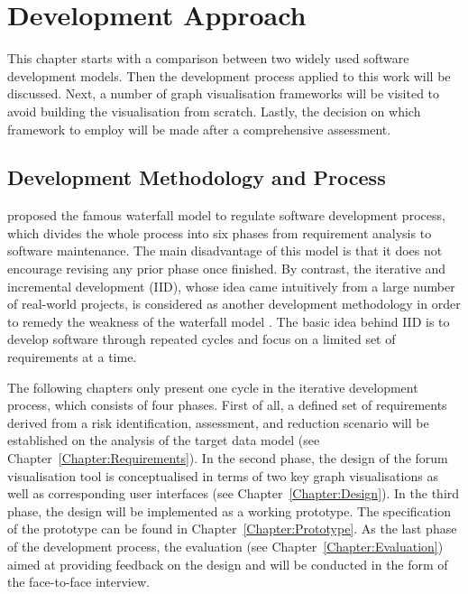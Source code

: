 \chapter{Development Approach} \label{Chapter:Approach}

This chapter starts with a comparison between two widely used software development models. Then the development process applied to this work will be discussed. Next, a number of graph visualisation frameworks will be visited to avoid building the visualisation from scratch. Lastly, the decision on which framework to employ will be made after a comprehensive assessment.

\section{Development Methodology and Process}

\citep{Royce1970} proposed the famous waterfall model to regulate software development process, which divides the whole process into six phases from requirement analysis to software maintenance. The main disadvantage of this model is that it does not encourage revising any prior phase once finished. By contrast, the iterative and incremental development (IID), whose idea came intuitively from a large number of real-world projects, is considered as another development methodology in order to remedy the weakness of the waterfall model \citep{Larman2003}. The basic idea behind IID is to develop software through repeated cycles and focus on a limited set of requirements at a time.

The following chapters only present one cycle in the iterative development process, which consists of four phases. First of all, a defined set of requirements derived from a risk identification, assessment, and reduction scenario will be established on the analysis of the target data model (see Chapter~\ref{Chapter:Requirements}). In the second phase, the design of the forum visualisation tool is conceptualised in terms of two key graph visualisations as well as corresponding user interfaces (see Chapter~\ref{Chapter:Design}). In the third phase, the design will be implemented as a working prototype. The specification of the prototype can be found in Chapter~\ref{Chapter:Prototype}. As the last phase of the development process, the evaluation (see Chapter~\ref{Chapter:Evaluation}) aimed at providing feedback on the design and will be conducted in the form of the face-to-face interview.

